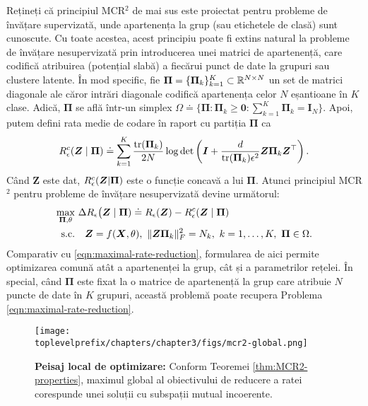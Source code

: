 \documentclass[../../book-main_ro.tex]{subfiles}
\begin{document}
Rețineți că principiul MCR$^2$ de mai sus este proiectat pentru probleme de învățare supervizată, unde apartenența la grup (sau etichetele de clasă) sunt cunoscute. Cu toate acestea, acest principiu poate fi extins natural la probleme de învățare nesupervizată prin introducerea unei matrici de apartenență, care codifică atribuirea (potențial slabă) a fiecărui punct de date la grupuri sau clustere latente. În mod specific, fie $\bm \Pi = \{\bm \Pi_k\}_{k=1}^K \subset \mathbb{R}^{N\times N}$ un set de matrici diagonale ale căror intrări diagonale codifică apartenența celor $N$ eșantioane în $K$ clase. Adică, $\bm \Pi$ se află într-un simplex $\Omega \doteq \{\bm \Pi: \bm \Pi_k \ge \bm 0: \sum_{k=1}^K \bm \Pi_k = \bm I_N\}$. Apoi, putem defini rata medie de codare în raport cu partiția $\bm \Pi$ ca
\begin{align}\label{eq:MCRc}
    R_{\epsilon}^c(\bm{Z} \mid \bm \Pi) \doteq \sum_{k=1}^K \frac{\mathrm{tr}(\bm \Pi_k)}{2N}\log\det\left(\bm I + \frac{d}{\mathrm{tr}(\bm \Pi_k)\epsilon^2}\bm Z\bm \Pi_k \bm Z^\top \right).
\end{align}
Când $\bm Z$ este dat, $R_{\epsilon}^c(\bm{Z} \vert \bm \Pi)$ este o funcție concavă a lui $\bm \Pi$. Atunci principiul MCR$^2$ pentru probleme de învățare nesupervizată devine următorul:
\begin{align}\label{eq:MCR-pi}
    \max_{\bm \Pi, \theta} & \  \Delta R_{\epsilon}\big(\Z  \mid \bm \Pi) \doteq R_{\epsilon}(\bm Z) - R_{\epsilon}^c(\Z \mid \bm \Pi) \notag \\ 
   \mathrm{s.c.}  & \ \ \ \bm Z = f(\bm X, \theta),\ \|\bm Z \bm \Pi_k\|_F^2 = N_k,\ k = 1,\dots,K,\ \bm\Pi \in \Omega.

\end{align}
Comparativ cu \eqref{eqn:maximal-rate-reduction}, formularea de aici permite optimizarea comună atât a apartenenței la grup, cât și a parametrilor rețelei. În special, când $\bm \Pi$ este fixat la o matrice de apartenență la grup care atribuie $N$ puncte de date în $K$ grupuri, această problemă poate recupera Problema \eqref{eqn:maximal-rate-reduction}.

\begin{figure}[t]
	\centering
	\texttt{[image: \\toplevelprefix/chapters/chapter3/figs/mcr2-global.png]}
	\caption{{\bf Peisaj local de optimizare:} Conform Teoremei \ref{thm:MCR2-properties}, maximul global al obiectivului de reducere a ratei corespunde unei soluții cu subspații mutual incoerente.}
	\label{fig:mcr-global}
\end{figure}
\end{document}

